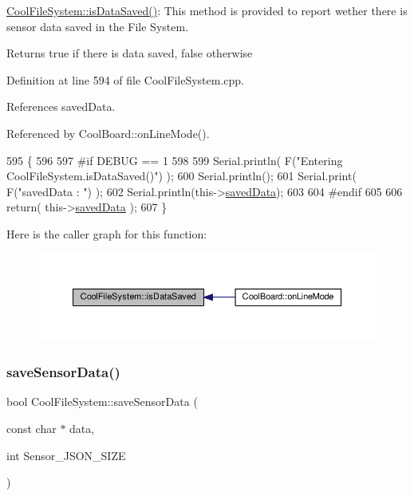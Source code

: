 \hyperlink{classCoolFileSystem_a5a7eaeea7a9fbf8aaef651d862fa3b5b}{Cool\+File\+System\+::is\+Data\+Saved()}\+: This method is provided to report wether there is sensor data saved in the File System.

\begin{DoxyReturn}{Returns}
true if there is data saved, false otherwise 
\end{DoxyReturn}


Definition at line 594 of file Cool\+File\+System.\+cpp.



References saved\+Data.



Referenced by Cool\+Board\+::on\+Line\+Mode().


\begin{DoxyCode}
595 \{
596 
597 \textcolor{preprocessor}{#if DEBUG == 1 }
598 
599     Serial.println( F(\textcolor{stringliteral}{"Entering CoolFileSystem.isDataSaved()"}) );
600     Serial.println();
601     Serial.print( F(\textcolor{stringliteral}{"savedData : "}) );
602     Serial.println(this->\hyperlink{classCoolFileSystem_ad398e0c5c41a0c88acdf5d672aa71351}{savedData});
603 
604 \textcolor{preprocessor}{#endif}
605 
606     \textcolor{keywordflow}{return}( this->\hyperlink{classCoolFileSystem_ad398e0c5c41a0c88acdf5d672aa71351}{savedData} );
607 \}
\end{DoxyCode}
Here is the caller graph for this function\+:
\nopagebreak
\begin{figure}[H]
\begin{center}
\leavevmode
\includegraphics[width=350pt]{classCoolFileSystem_a5a7eaeea7a9fbf8aaef651d862fa3b5b_icgraph}
\end{center}
\end{figure}
\mbox{\label{classCoolFileSystem_a4c560c2ddd40b74b7758e6ceb2c58957}} 
\subsubsection{\texorpdfstring{save\+Sensor\+Data()}{saveSensorData()}}
{\footnotesize\ttfamily bool Cool\+File\+System\+::save\+Sensor\+Data (\begin{DoxyParamCaption}\item[{const char $\ast$}]{data,  }\item[{int}]{Sensor\+\_\+\+J\+S\+O\+N\+\_\+\+S\+I\+ZE }\end{DoxyParamCaption})}

